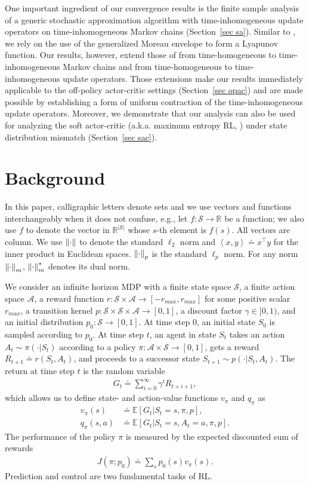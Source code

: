 \documentclass[twoside,11pt]{article}
\newcommand{\fS}{\mathcal{S}}
\newcommand{\fA}{\mathcal{A}}
\newcommand{\R}{\mathbb{R}}
\newcommand{\E}{\mathbb{E}}
\newcommand{\ns}{{|\fS|}}
\newcommand{\indot}[2]{{\left<#1, #2\right>}}
\numberwithin{assucounter}{section}
\begin{document}
One important ingredient of our convergence results is the finite sample analysis of a generic stochastic approximation algorithm with time-inhomogeneous update operators on time-inhomogeneous Markov chains (Section~\ref{sec sa}).
Similar to \citet{chen2021lyapunov},
we rely on the use of the generalized Moreau envelope to form a Lyapunov function.
Our results, however,
extend those of \citet{chen2021lyapunov} from time-homogeneous to time-inhomogeneous Markov chains and
from time-homogeneous to time-inhomogeneous update operators.
Those extensions make our results immediately applicable to the off-policy actor-critic settings (Section~\ref{sec opac}) and
are made possible by establishing a form of uniform contraction of the time-inhomogeneous update operators.
Moreover, we demonstrate that our analysis can also be used for analyzing the soft actor-critic (a.k.a. maximum entropy RL, \citealt{nachum2017bridging,haarnoja2018soft}) under state distribution mismatch (Section~\ref{sec sac}).

\section{Background}
In this paper,
calligraphic letters denote sets and we use vectors and functions interchangeably when it does not confuse, e.g.,
let $f: \fS \to \R$ be a function; 
we also use $f$ to denote the vector in $\R^\ns$ whose $s$-th element is $f(s)$.
All vectors are column.
We use $\norm{\cdot}$ to denote the standard $\ell_2$ norm and $\indot{x}{y} \doteq x^\top y$ for the inner product in Euclidean spaces.
$\norm{\cdot}_p$ is the standard $\ell_p$ norm.
For any norm $\norm{\cdot}_m$,
$\norm{\cdot}^*_m$ denotes its dual norm.

We consider an infinite horizon MDP with a finite state space $\fS$,
a finite action space $\fA$,
a reward function $r: \fS \times \fA \to [-r_{max}, r_{max}]$ for some positive scalar $r_{max}$,
a transition kernel $p: \fS \times \fS \times \fA \to [0, 1]$,
a discount factor $\gamma \in [0, 1)$,
and an initial distribution $p_0: \fS \to [0, 1]$.
At time step 0, an initial state $S_0$ is sampled according to $p_0$.
At time step $t$,
an agent in state $S_t$ takes an action $A_t \sim \pi(\cdot | S_t)$ according to a policy $\pi: \fA \times \fS \to [0, 1]$,
gets a reward $R_{t+1} \doteq r(S_t, A_t)$,
and proceeds to a successor state $S_{t+1} \sim p(\cdot | S_t, A_t)$.
The return at time step $t$ is the random variable
\begin{align}
  G_t \doteq \sum_{i=0}^{\infty} \gamma^i R_{t+i+1},
\end{align}
which allows us to define state- and action-value functions $v_\pi$ and $q_\pi$ as
\begin{align}
  v_\pi(s) &\doteq \E[G_t | S_t = s, \pi, p], \\
  q_\pi(s, a) &\doteq \E[G_t | S_t = s, A_t = a, \pi, p].
\end{align}
The performance of the policy $\pi$ is measured by the expected discounted sum of rewards
\begin{align}
  J(\pi; p_0) \doteq \sum_s p_0(s) v_\pi(s).
\end{align}
Prediction and control are two fundamental tasks of RL.
\end{document}
